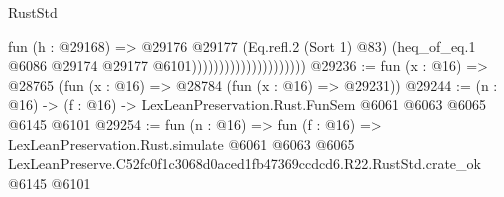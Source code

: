 \begin{lexlean}{RustStd}
\begin{coremodule}
                                          fun (h : @29168) =>
                                          @29176
                                            @29177
                                            (Eq.refl.{2} (Sort 1) @83)
                                            (heq_of_eq.{1}
                                              @6086
                                              @29174
                                              @29177
                                              @6101)))))))))))))))))))))
@29236 := fun (x : @16) => @28765 (fun (x : @16) => @28784 (fun (x : @16) => @29231))
@29244 := (n : @16) -> (f : @16) -> LexLeanPreservation.Rust.FunSem @6061 @6063 @6065 @6145 @6101
@29254 := fun (n : @16) =>
  fun (f : @16) =>
  LexLeanPreservation.Rust.simulate
    @6061
    @6063
    @6065
    LexLeanPreserve.C52fc0f1c3068d0aced1fb47369ccdcd6.R22.RustStd.crate_ok
    @6145
    @6101
\end{coremodule}
\end{lexlean}
